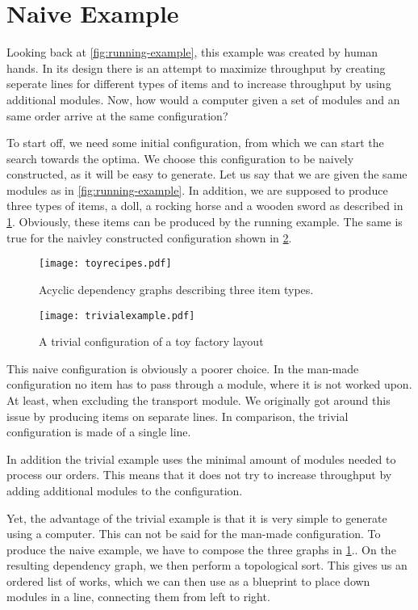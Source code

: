 \section{Naive Example}
Looking back at \cref{fig:running-example}, this example was created by human hands. In its design there is an attempt to maximize throughput by creating seperate lines for different types of items and to increase throughput by using additional modules. Now, how would a computer given a set of modules and an same order arrive at the same configuration?

To start off, we need some initial configuration, from which we can start the search towards the optima. We choose this configuration to be naively constructed, as it will be easy to generate. Let us say that we are given the same modules as in \cref{fig:running-example}. In addition, we are supposed to produce three types of items, a doll, a rocking horse and a wooden sword as described in \cref{fig:toy-recipes}. Obviously, these items can be produced by the running example. The same is true for the naivley constructed configuration shown in \cref{fig:trivial-example}.  

\begin{figure}[H]
\centering
\texttt{[image: toyrecipes.pdf]}
\caption{Acyclic dependency graphs describing three item types.}
\label{fig:toy-recipes}
\end{figure}

\begin{figure}[H]
\centering
\texttt{[image: trivialexample.pdf]}
\caption{A trivial configuration of a toy factory layout}
\label{fig:trivial-example}
\end{figure}


This naive configuration is obviously a poorer choice. In the man-made configuration no item has to pass through a module, where it is not worked upon. At least, when excluding the transport module. We originally got around this issue by producing items on separate lines. In comparison, the trivial configuration is made of a single line.

In addition the trivial example uses the minimal amount of modules needed to process our orders. This means that it does not try to increase throughput by adding additional modules to the configuration. 

Yet, the advantage of the trivial example is that it is very simple to generate using a computer. This can not be said for the man-made configuration. To produce the naive example, we have to compose the three graphs in \cref{fig:toy-recipes}.. On the resulting dependency graph, we then perform a topological sort. This gives us an ordered list of works, which we can then use as a blueprint to place down modules in a line, connecting them from left to right.

